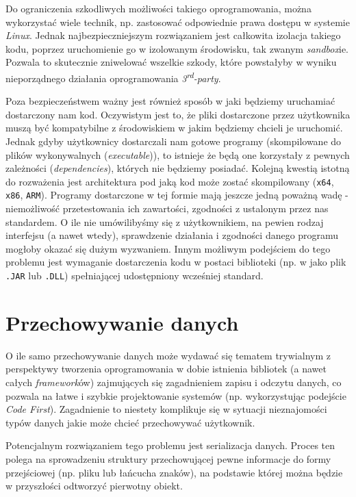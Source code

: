 \par Do ograniczenia szkodliwych możliwości takiego oprogramowania, można wykorzystać wiele technik, np. zastosować odpowiednie prawa dostępu w systemie \emph{Linux}. Jednak najbezpieczniejszym rozwiązaniem jest całkowita izolacja takiego kodu, poprzez uruchomienie go w izolowanym środowisku, tak zwanym \emph{sandbox}ie. Pozwala to skutecznie zniwelować wszelkie szkody, które powstałyby w wyniku nieporządnego działania oprogramowania \emph{3\textsuperscript{rd}-party}.

\par Poza bezpieczeństwem ważny jest również sposób w jaki będziemy uruchamiać dostarczony nam kod. Oczywistym jest to, że pliki dostarczone przez użytkownika muszą być kompatybilne z środowiskiem w jakim będziemy chcieli je uruchomić. Jednak gdyby użytkownicy dostarczali nam gotowe programy (skompilowane do plików wykonywalnych (\emph{executable})), to istnieje że będą one korzystały z pewnych zależności (\emph{dependencies}), których nie będziemy posiadać. Kolejną kwestią istotną do rozważenia jest architektura pod jaką kod może zostać skompilowany (\texttt{x64}, \texttt{x86}, \texttt{ARM}). Programy dostarczone w tej formie mają jeszcze jedną poważną wadę - niemożliwość przetestowania ich zawartości, zgodności z ustalonym przez nas standardem. O ile nie umówilibyśmy się z użytkownikiem, na pewien rodzaj interfejsu (a nawet wtedy), sprawdzenie działania i zgodności danego programu mogłoby okazać się dużym wyzwaniem. Innym możliwym podejściem do tego problemu jest wymaganie dostarczenia kodu w postaci biblioteki (np. w jako plik \texttt{.JAR} lub \texttt{.DLL}) spełniającej udostępniony wcześniej standard.

\section{Przechowywanie danych}

\par O ile samo przechowywanie danych może wydawać się tematem trywialnym z perspektywy tworzenia oprogramowania w dobie istnienia bibliotek (a nawet całych \emph{framework}ów) zajmujących się zagadnieniem zapisu i odczytu danych, co pozwala na łatwe i szybkie projektowanie systemów (np. wykorzystując podejście \emph{Code First}). Zagadnienie to niestety komplikuje się w sytuacji nieznajomości typów danych jakie może chcieć przechowywać użytkownik.

\par Potencjalnym rozwiązaniem tego problemu jest serializacja danych. Proces ten polega na sprowadzeniu struktury przechowującej pewne informacje do formy przejściowej (np. pliku lub łańcucha znaków), na podstawie której można będzie w przyszłości odtworzyć pierwotny obiekt.


